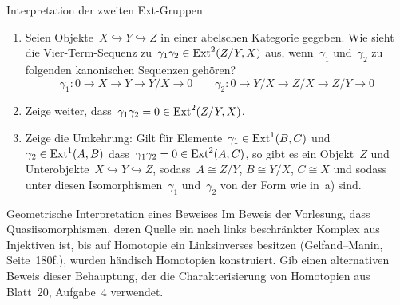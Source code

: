 \documentclass{uebblatt}
\begin{document}
\begin{aufgabe}{Interpretation der zweiten Ext-Gruppen}
\begin{enumerate}
\item Seien Objekte~$X \hookrightarrow Y \hookrightarrow Z$ in einer abelschen
Kategorie gegeben. Wie sieht die Vier-Term-Sequenz zu~$\gamma_1 \gamma_2 \in
\mathrm{Ext}^2(Z/Y,X)$ aus, wenn~$\gamma_1$ und~$\gamma_2$ zu folgenden kanonischen
Sequenzen gehören?
\[ \gamma_1 : 0 \to X \to Y \to Y/X \to 0 \qquad
  \gamma_2 : 0 \to Y/X \to Z/X \to Z/Y \to 0 \]
\vspace{-1.7em}
\item Zeige weiter, dass~$\gamma_1 \gamma_2 = 0 \in \mathrm{Ext}^2(Z/Y,X)$.
\item Zeige die Umkehrung: Gilt für Elemente~$\gamma_1 \in \mathrm{Ext}^1(B,C)$ und
$\gamma_2 \in \mathrm{Ext}^1(A,B)$ dass~$\gamma_1 \gamma_2 = 0 \in \mathrm{Ext}^2(A,C)$, so
gibt es ein Objekt~$Z$ und Unterobjekte~$X \hookrightarrow Y \hookrightarrow
Z$, sodass~$A \cong Z/Y$, $B \cong Y/X$, $C \cong X$ und sodass unter diesen
Isomorphismen~$\gamma_1$ und~$\gamma_2$ von der Form wie in~a) sind.
\end{enumerate}
\end{aufgabe}

\newpage

\begin{aufgabe}{Geometrische Interpretation eines Beweises}
Im Beweis der Vorlesung, dass Quasiisomorphismen, deren Quelle ein nach links
beschränkter Komplex aus Injektiven ist, bis auf Homotopie ein Linksinverses
besitzen (Gelfand--Manin, Seite~180f.), wurden händisch Homotopien konstruiert.
Gib einen alternativen Beweis dieser Behauptung, der die
Charakterisierung von Homotopien aus Blatt~20, Aufgabe~4 verwendet.
\end{aufgabe}
\end{document}

